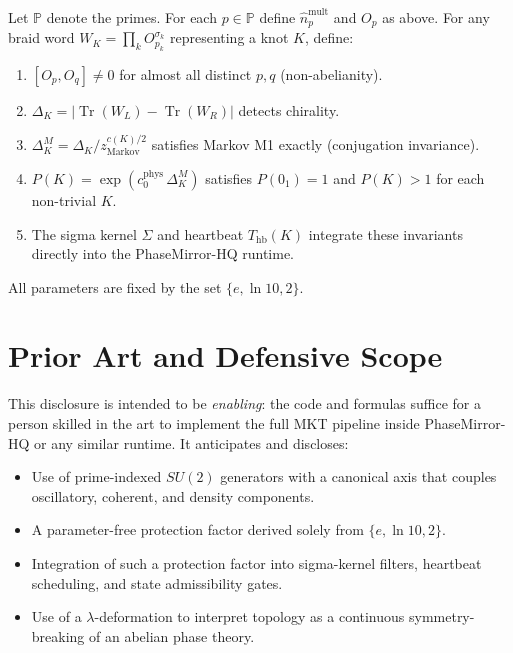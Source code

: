 \documentclass[11pt]{article}
\theoremstyle{remark}
\begin{document}
\begin{tcolorbox}[colback=dkblue!6,colframe=dkblue,
  title=\textbf{Master Theorem (MKT $\&$ PhaseMirror-HQ, April 2026)}]
Let $\mathbb{P}$ denote the primes. For each $p\in\mathbb{P}$ define
$\hat{n}_p^{\text{mult}}$ and $O_p$ as above. For any braid word
$W_K = \prod_k O_{p_k}^{\sigma_k}$ representing a knot $K$, define:

\begin{enumerate}[nosep]
  \item $[O_p,O_q] \neq 0$ for almost all distinct $p,q$ (non-abelianity).
  \item $\Delta_K = |\operatorname{Tr}(W_L) - \operatorname{Tr}(W_R)|$
        detects chirality.
  \item $\Delta_K^M = \Delta_K / z_{\text{Markov}}^{c(K)/2}$ satisfies
        Markov M1 exactly (conjugation invariance).
  \item $P(K)=\exp(c_0^{\text{phys}}\,\Delta_K^M)$ satisfies $P(0_1)=1$ and
        $P(K)>1$ for each non-trivial $K$.
  \item The sigma kernel $\Sigma$ and heartbeat $T_{\text{hb}}(K)$ integrate
        these invariants directly into the PhaseMirror-HQ runtime.
\end{enumerate}

All parameters are fixed by the set $\{e,\ln 10,2\}$.
\end{tcolorbox}

\section{Prior Art and Defensive Scope}

This disclosure is intended to be \emph{enabling}: the code and formulas
suffice for a person skilled in the art to implement the full MKT pipeline
inside PhaseMirror-HQ or any similar runtime. It anticipates and discloses:

\begin{itemize}[leftmargin=*]
  \item Use of prime-indexed $SU(2)$ generators with a canonical axis that
        couples oscillatory, coherent, and density components.
  \item A parameter-free protection factor derived solely from $\{e, \ln 10, 2\}$.
  \item Integration of such a protection factor into sigma-kernel filters,
        heartbeat scheduling, and state admissibility gates.
  \item Use of a $\lambda$-deformation to interpret topology as a continuous
        symmetry-breaking of an abelian phase theory.
\end{itemize}
\end{document}
